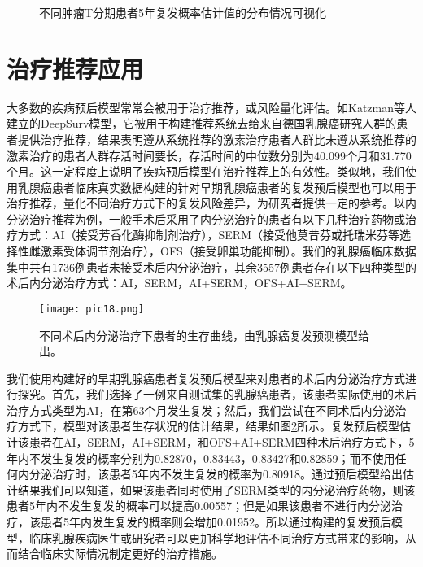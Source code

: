 \begin{figure}[h]
\centering 
{}
\hspace{0.01\linewidth}
\caption{不同肿瘤T分期患者5年复发概率估计值的分布情况可视化}
\label{pic17}
\end{figure}

\section{治疗推荐应用}
大多数的疾病预后模型常常会被用于治疗推荐，或风险量化评估。如Katzman等人 建立的DeepSurv模型，它被用于构建推荐系统去给来自德国乳腺癌研究人群的患者提供治疗推荐，结果表明遵从系统推荐的激素治疗患者人群比未遵从系统推荐的激素治疗的患者人群存活时间要长，存活时间的中位数分别为40.099个月和31.770个月。这一定程度上说明了疾病预后模型在治疗推荐上的有效性。类似地，我们使用乳腺癌患者临床真实数据构建的针对早期乳腺癌患者的复发预后模型也可以用于治疗推荐，量化不同治疗方式下的复发风险差异，为研究者提供一定的参考。以内分泌治疗推荐为例，一般手术后采用了内分泌治疗的患者有以下几种治疗药物或治疗方式：AI（接受芳香化酶抑制剂治疗），SERM（接受他莫昔芬或托瑞米芬等选择性雌激素受体调节剂治疗），OFS（接受卵巢功能抑制）。我们的乳腺癌临床数据集中共有1736例患者未接受术后内分泌治疗，其余3557例患者存在以下四种类型的术后内分泌治疗方式：AI，SERM，AI+SERM，OFS+AI+SERM。

\begin{figure}[H]
\texttt{[image: pic18.png]}
\caption{不同术后内分泌治疗下患者的生存曲线，由乳腺癌复发预测模型给出。}
\label{pic18}
\end{figure}

我们使用构建好的早期乳腺癌患者复发预后模型来对患者的术后内分泌治疗方式进行探究。首先，我们选择了一例来自测试集的乳腺癌患者，该患者实际使用的术后治疗方式类型为AI，在第63个月发生复发；然后，我们尝试在不同术后内分泌治疗方式下，模型对该患者生存状况的估计结果，结果如图\ref{pic18}所示。复发预后模型估计该患者在AI，SERM，AI+SERM，和OFS+AI+SERM四种术后治疗方式下，5年内不发生复发的概率分别为0.82870，0.83443，0.83427和0.82859；而不使用任何内分泌治疗时，该患者5年内不发生复发的概率为0.80918。通过预后模型给出估计结果我们可以知道，如果该患者同时使用了SERM类型的内分泌治疗药物，则该患者5年内不发生复发的概率可以提高0.00557；但是如果该患者不进行内分泌治疗，该患者5年内发生复发的概率则会增加0.01952。所以通过构建的复发预后模型，临床乳腺疾病医生或研究者可以更加科学地评估不同治疗方式带来的影响，从而结合临床实际情况制定更好的治疗措施。

